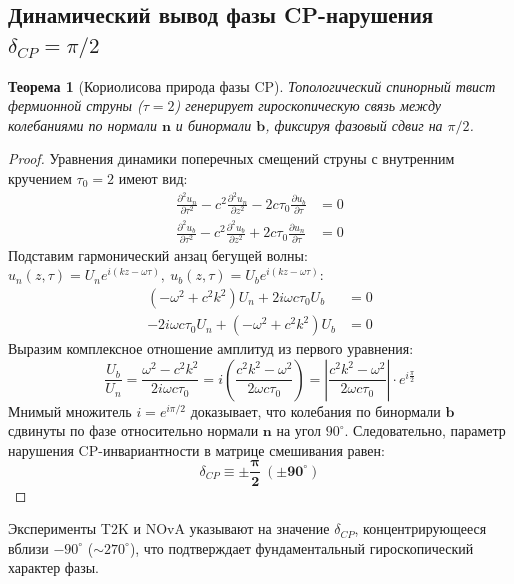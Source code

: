 \documentclass[12pt,a4paper]{article}
\newtheorem{theorem}{Теорема}
\begin{document}
\subsection{Динамический вывод фазы CP-нарушения $\delta_{CP} = \pi/2$}
\begin{theorem}[Кориолисова природа фазы CP]
	Топологический спинорный твист фермионной струны ($\tau = 2$) генерирует гироскопическую связь между колебаниями по нормали $\mathbf{n}$ и бинормали $\mathbf{b}$, фиксируя фазовый сдвиг на $\pi/2$.
\end{theorem}

\begin{proof}
	Уравнения динамики поперечных смещений струны с внутренним кручением $\tau_0 = 2$ имеют вид:
	\begin{align}
		\frac{\partial^2 u_n}{\partial \tau^2} - c^2 \frac{\partial^2 u_n}{\partial z^2} - 2 c \tau_0 \frac{\partial u_b}{\partial \tau} &= 0 \\
		\frac{\partial^2 u_b}{\partial \tau^2} - c^2 \frac{\partial^2 u_b}{\partial z^2} + 2 c \tau_0 \frac{\partial u_n}{\partial \tau} &= 0
	\end{align}
	Подставим гармонический анзац бегущей волны:\\ $u_n(z,\tau) = U_n e^{i(k z - \omega \tau)}, \ u_b(z,\tau) = U_b e^{i(k z - \omega \tau)}$:
	\begin{align}
		(-\omega^2 + c^2 k^2) U_n + 2 i \omega c \tau_0 U_b &= 0 \\
		-2 i \omega c \tau_0 U_n + (-\omega^2 + c^2 k^2) U_b &= 0
	\end{align}
	Выразим комплексное отношение амплитуд из первого уравнения:
	\begin{equation}
		\frac{U_b}{U_n} = \frac{\omega^2 - c^2 k^2}{2 i \omega c \tau_0} = i \left( \frac{c^2 k^2 - \omega^2}{2 \omega c \tau_0} \right) = \left| \frac{c^2 k^2 - \omega^2}{2 \omega c \tau_0} \right| \cdot e^{i \frac{\pi}{2}}
	\end{equation}
	Мнимый множитель $i = e^{i\pi/2}$ доказывает, что колебания по бинормали $\mathbf{b}$ сдвинуты по фазе относительно нормали $\mathbf{n}$ на угол $90^{\circ}$. 
	Следовательно, параметр нарушения CP-инвариантности в матрице смешивания равен:
	\begin{equation}
		\delta_{CP} \equiv \mathbf{\pm \frac{\pi}{2} \ (\pm 90^{\circ})}
	\end{equation}
\end{proof}
Эксперименты T2K и NOvA указывают на значение $\delta_{CP}$, концентрирующееся вблизи $-90^{\circ}$ ($\sim 270^{\circ}$), что подтверждает фундаментальный гироскопический характер фазы.
\end{document}
